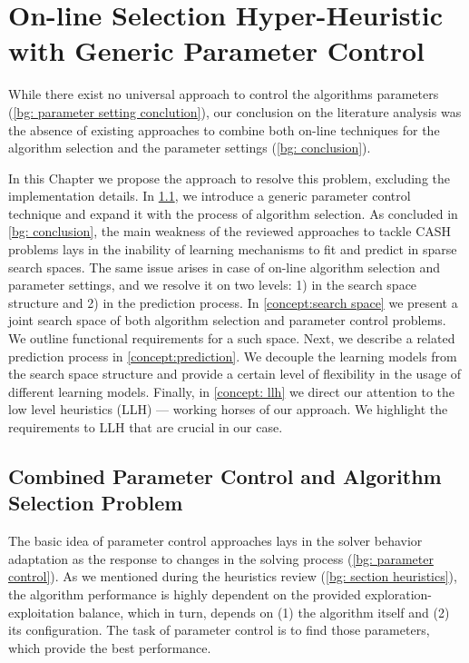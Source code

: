 \chapter{On-line Selection Hyper-Heuristic with Generic Parameter Control}\label{Concept description}
While there exist no universal approach to control the algorithms parameters (\cref{bg: parameter setting conclution}), our conclusion on the literature analysis was the absence of existing approaches to combine both on-line techniques for the algorithm selection and the parameter settings (\cref{bg: conclusion}). 

In this Chapter we propose the approach to resolve this problem, excluding the implementation details. In \cref{concept:parameter control}, we introduce a generic parameter control technique and expand it with the process of algorithm selection. As concluded in \cref{bg: conclusion}, the main weakness of the reviewed approaches to tackle CASH problems lays in the inability of learning mechanisms to fit and predict in sparse search spaces. The same issue arises in case of on-line algorithm selection and parameter settings, and we resolve it on two levels: 1) in the search space structure and 2) in the prediction process. In \cref{concept:search space} we present a joint search space of both algorithm selection and parameter control problems. We outline functional requirements for a such space. Next, we describe a related prediction process in \cref{concept:prediction}. We decouple the learning models from the search space structure and provide a certain level of flexibility in the usage of different learning models.
Finally, in \cref{concept: llh} we direct our attention to the low level heuristics (LLH) — working horses of our approach. We highlight the requirements to LLH that are crucial in our case.


\section{Combined Parameter Control and Algorithm Selection Problem}\label{concept:parameter control}
The basic idea of parameter control approaches lays in the solver behavior adaptation as the response to changes in the solving process (\cref{bg: parameter control}). As we mentioned during the heuristics review (\cref{bg: section heuristics}), the algorithm performance is highly dependent on the provided exploration-exploitation balance, which in turn, depends on (1) the algorithm itself and (2) its configuration. The task of parameter control is to find those parameters, which provide the best performance.

